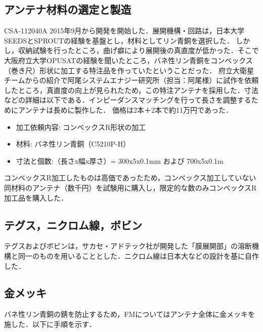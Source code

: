 \subsection{アンテナ材料の選定と製造}CSA-112040A 
2015年9月から開発を開始した．展開機構・回路は，日本大学SEEDSとSPROUTの経験を基盤とし，材料としてリン青銅を選択した．
しかし，収納試験を行ったところ，曲げ癖により展開後の真直度が低かった．そこで大阪府立大学OPUSATの経験を聞いたところ，バネ性リン青銅をコンベックス（巻き尺）形状に加工する特注品を作っていたということだった．
府立大衛星チームからの紹介で阿尾システムエナジー研究所（担当：阿尾様）に試作を依頼したところ，真直度の向上が見られたため，この特注アンテナを採用した．寸法などの詳細は以下である．インピーダンスマッチングを行って長さを調整するためにアンテナは長めに製作した．
価格は2本＋2本で約11万円であった．
\begin{itemize}
	\item 加工依頼内容: コンベックスR形状の加工
	\item 材料: バネ性リン青銅（C5210P-H）
	\item 寸法と個数:（長さx幅x厚さ）= 300x5x0.1mm および 700x5x0.1m  
\end{itemize}
コンベックスR加工したものは高価であったため，コンベックス加工していない同材料のアンテナ（数千円）を試験用に購入し，限定的な数のみコンベックスR加工品を購入した．
 
\subsection{テグス，ニクロム線，ボビン}
テグスおよびボビンは，サカセ・アドテック社が開発した「膜展開部」の溶断機構と同一のものを用いることとした．ニクロム線は日本大などの設計を基に自作した．

\subsection{金メッキ}
バネ性リン青銅の錆を防止するため，FMについてはアンテナ全体に金メッキを施した．以下に手順を示す．

